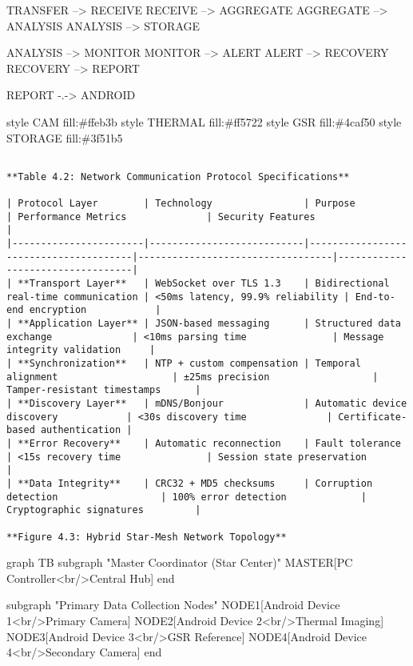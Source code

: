 \documentclass[12pt,a4paper]{report}
\begin{document}
    TRANSFER --> RECEIVE
    RECEIVE --> AGGREGATE
    AGGREGATE --> ANALYSIS
    ANALYSIS --> STORAGE
    
    ANALYSIS --> MONITOR
    MONITOR --> ALERT
    ALERT --> RECOVERY
    RECOVERY --> REPORT
    
    REPORT -.-> ANDROID
    
    style CAM fill:\#ffeb3b
    style THERMAL fill:\#ff5722
    style GSR fill:\#4caf50
    style STORAGE fill:\#3f51b5
\begin{verbatim}

**Table 4.2: Network Communication Protocol Specifications**

| Protocol Layer        | Technology                | Purpose                               | Performance Metrics              | Security Features                |
|-----------------------|---------------------------|---------------------------------------|----------------------------------|----------------------------------|
| **Transport Layer**   | WebSocket over TLS 1.3    | Bidirectional real-time communication | <50ms latency, 99.9% reliability | End-to-end encryption            |
| **Application Layer** | JSON-based messaging      | Structured data exchange              | <10ms parsing time               | Message integrity validation     |
| **Synchronization**   | NTP + custom compensation | Temporal alignment                    | ±25ms precision                  | Tamper-resistant timestamps      |
| **Discovery Layer**   | mDNS/Bonjour              | Automatic device discovery            | <30s discovery time              | Certificate-based authentication |
| **Error Recovery**    | Automatic reconnection    | Fault tolerance                       | <15s recovery time               | Session state preservation       |
| **Data Integrity**    | CRC32 + MD5 checksums     | Corruption detection                  | 100% error detection             | Cryptographic signatures         |

**Figure 4.3: Hybrid Star-Mesh Network Topology**

\end{verbatim}
graph TB
    subgraph "Master Coordinator (Star Center)"
        MASTER[PC Controller<br/>Central Hub]
    end

    subgraph "Primary Data Collection Nodes"
        NODE1[Android Device 1<br/>Primary Camera]
        NODE2[Android Device 2<br/>Thermal Imaging]
        NODE3[Android Device 3<br/>GSR Reference]
        NODE4[Android Device 4<br/>Secondary Camera]
    end
\end{document}
